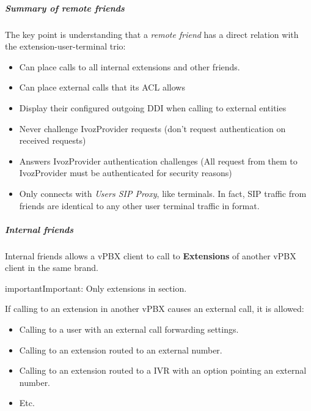 \documentclass[letterpaper,10pt,english]{sphinxmanual}
\begin{document}
\subparagraph{Summary of remote friends}
\label{administration_portal/client/vpbx/routing_endpoints/friends/remote_friends:summary-of-remote-friends}
The key point is understanding that a \emph{remote friend} has a direct relation with the
extension-user-terminal trio:
\begin{itemize}
\item {} 
Can place calls to all internal extensions and other friends.

\item {} 
Can place external calls that its ACL allows

\item {} 
Display their configured outgoing DDI when calling to external entities

\item {} 
Never challenge IvozProvider requests (don't request authentication on received requests)

\item {} 
Answers IvozProvider authentication challenges (All request from them to
IvozProvider must be authenticated for security reasons)

\item {} 
Only connects with \emph{Users SIP Proxy}, like terminals. In fact, SIP traffic from
friends are identical to any other user terminal traffic in format.

\end{itemize}


\subparagraph{Internal friends}
\label{administration_portal/client/vpbx/routing_endpoints/friends/internal_friends::doc}\label{administration_portal/client/vpbx/routing_endpoints/friends/internal_friends:internal-friends}
Internal friends allows a vPBX client to call to \textbf{Extensions} of another vPBX client in the same brand.

\begin{notice}{important}{Important:}
Only extensions in {\hyperref[administration_portal/client/vpbx/extensions:extensions]{}} section.
\end{notice}

If calling to an extension in another vPBX causes an external call, it is allowed:
\begin{itemize}
\item {} 
Calling to a user with an external call forwarding settings.

\item {} 
Calling to an extension routed to an external number.

\item {} 
Calling to an extension routed to a IVR with an option pointing an external number.

\item {} 
Etc.

\end{itemize}
\end{document}
